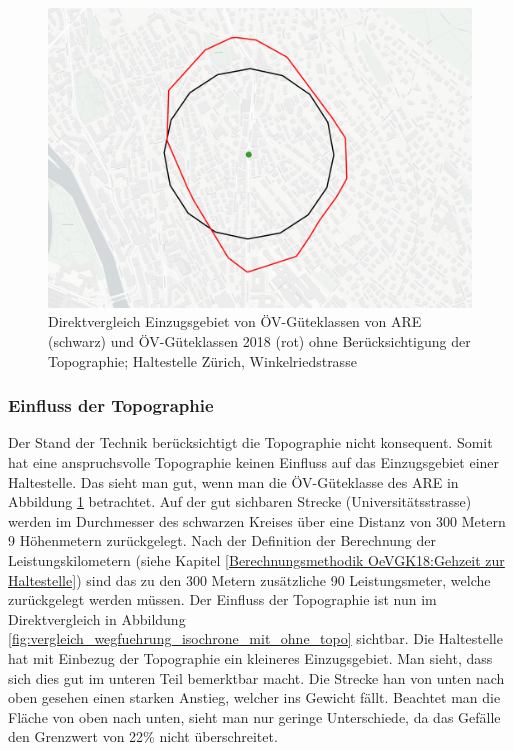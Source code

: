 \begin{figure}[ht]
    \centering
    \includegraphics[width=0.8\linewidth]{technicalreport/img/vergleich_wegfuehrung_are_isochrone}
    \caption[Direktvergleich Einzugsgebiet ARE und Isochrone]{Direktvergleich Einzugsgebiet von ÖV-Güteklassen von \ac{ARE} (schwarz) und ÖV-Güteklassen 2018 (rot) ohne Berücksichtigung der Topographie; Haltestelle Zürich, Winkelriedstrasse}
    \label{fig:vergleich_wegfuehrung_are_isochrone}
\end{figure}

\subsubsection{Einfluss der Topographie}

Der Stand der Technik berücksichtigt die Topographie nicht konsequent.
Somit hat eine anspruchsvolle Topographie keinen Einfluss auf das Einzugsgebiet einer Haltestelle.
Das sieht man gut, wenn man die ÖV-Güteklasse des \acl{ARE} in Abbildung \ref{fig:vergleich_wegfuehrung_are_isochrone} betrachtet.
Auf der gut sichbaren Strecke (Universitätsstrasse) werden im Durchmesser des schwarzen Kreises über eine Distanz von 300 Metern 9 Höhenmetern zurückgelegt.
Nach der Definition der Berechnung der Leistungskilometern (siehe Kapitel \ref{Berechnungsmethodik OeVGK18:Gehzeit zur Haltestelle}) sind das zu den 300 Metern zusätzliche 90 Leistungsmeter, welche zurückgelegt werden müssen.
Der Einfluss der Topographie ist nun im Direktvergleich in Abbildung \ref{fig:vergleich_wegfuehrung_isochrone_mit_ohne_topo} sichtbar.
Die Haltestelle hat mit Einbezug der Topographie ein kleineres Einzugsgebiet.
Man sieht, dass sich dies gut im unteren Teil bemerktbar macht.
Die Strecke han von unten nach oben gesehen einen starken Anstieg, welcher ins Gewicht fällt.
Beachtet man die Fläche von oben nach unten, sieht man nur geringe Unterschiede, da das Gefälle den Grenzwert von 22\% nicht überschreitet.


